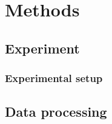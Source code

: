 \chapter{Methods}\label{chapter:methods}
\section{Experiment}\label{sec:experiment}
\subsection{Experimental setup}\label{subsection:set-up}
\section{Data processing}\label{sec:experiment}


